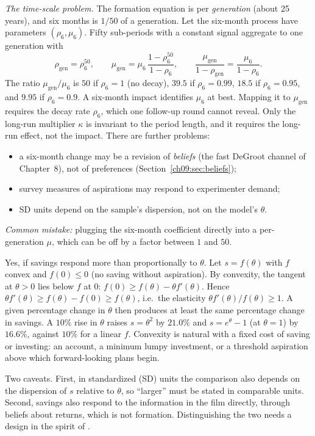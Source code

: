 \documentclass[../solutions_manual.tex]{subfiles}
\begin{document}
\emph{The time-scale problem.} The formation equation is per \emph{generation} (about 25 years), and six months is $1/50$ of a generation. Let the six-month process have parameters $(\rho_{6}, \mu_{6})$. Fifty sub-periods with a constant signal aggregate to one generation with
\[
\rho_{\text{gen}} = \rho_6^{50}, \qquad \mu_{\text{gen}} = \mu_6\,\frac{1 - \rho_6^{50}}{1 - \rho_6}, \qquad \frac{\mu_{\text{gen}}}{1 - \rho_{\text{gen}}} = \frac{\mu_6}{1 - \rho_6}.
\]
The ratio $\mu_{\text{gen}}/\mu_6$ is $50$ if $\rho_6 = 1$ (no decay), $39.5$ if $\rho_6 = 0.99$, $18.5$ if $\rho_6 = 0.95$, and $9.95$ if $\rho_6 = 0.9$. A six-month impact identifies $\mu_6$ at best. Mapping it to $\mu_{\text{gen}}$ requires the decay rate $\rho_6$, which one follow-up round cannot reveal. Only the long-run multiplier $\kappa$ is invariant to the period length, and it requires the long-run effect, not the impact. There are further problems:
\begin{itemize}
\item a six-month change may be a revision of \emph{beliefs} (the fast DeGroot channel of Chapter~8), not of preferences (Section~\ref{ch09:sec:beliefs});
\item survey measures of aspirations may respond to experimenter demand;
\item SD units depend on the sample's dispersion, not on the model's $\theta$.
\end{itemize}
\emph{Common mistake:} plugging the six-month coefficient directly into a per-generation $\mu$, which can be off by a factor between $1$ and $50$.

 Yes, if savings respond more than proportionally to $\theta$. Let $s = f(\theta)$ with $f$ convex and $f(0) \le 0$ (no saving without aspiration). By convexity, the tangent at $\theta > 0$ lies below $f$ at $0$: $f(0) \ge f(\theta) - \theta f'(\theta)$. Hence $\theta f'(\theta) \ge f(\theta) - f(0) \ge f(\theta)$, i.e.\ the elasticity $\theta f'(\theta)/f(\theta) \ge 1$. A given percentage change in $\theta$ then produces at least the same percentage change in savings. A $10\%$ rise in $\theta$ raises $s = \theta^2$ by $21.0\%$ and $s = e^\theta - 1$ (at $\theta = 1$) by $16.6\%$, against $10\%$ for a linear $f$. Convexity is natural with a fixed cost of saving or investing: an account, a minimum lumpy investment, or a threshold aspiration above which forward-looking plans begin.

Two caveats. First, in standardized (SD) units the comparison also depends on the dispersion of $s$ relative to $\theta$, so ``larger'' must be stated in comparable units. Second, savings also respond to the information in the film directly, through beliefs about returns, which is not formation. Distinguishing the two needs a design in the spirit of \citet{bursztyn2014understanding}.
\end{document}
